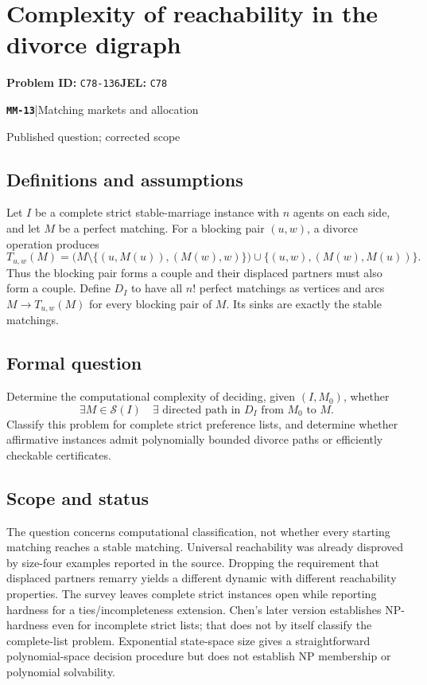 \documentclass[11pt,a4paper]{article}
\newcommand{\entrymeta}[3]{{\sffamily\small\color{muted}\textbf{\texttt{#1}}\quad|\quad #2\par #3\par}}
\begin{document}
\section*{Complexity of reachability in the divorce digraph}
\textbf{Problem ID:} \texttt{C78-136}\quad \textbf{JEL:} \texttt{C78}\par
\label{problem:OP-0554}
\label{beyond:MM-13}
\entrymeta{MM-13}{Matching markets and allocation}{Published question; corrected scope}
\subsection*{Definitions and assumptions}
Let $I$ be a complete strict stable-marriage instance with $n$ agents on each side, and let $M$ be a perfect matching. For a blocking pair $(u,w)$, a divorce operation produces
\[
 T_{u,w}(M)=
 \bigl(M\setminus\{(u,M(u)),(M(w),w)\}\bigr)
 \cup\{(u,w),(M(w),M(u))\}.
\]
Thus the blocking pair forms a couple and their displaced partners must also form a couple. Define $D_I$ to have all $n!$ perfect matchings as vertices and arcs $M\to T_{u,w}(M)$ for every blocking pair of $M$. Its sinks are exactly the stable matchings.
\subsection*{Formal question}
Determine the computational complexity of deciding, given $(I,M_0)$, whether
\[
 \exists M\in\mathcal S(I)\quad\exists\text{ directed path in }D_I
 \text{ from }M_0\text{ to }M.
\]
Classify this problem for complete strict preference lists, and determine whether affirmative instances admit polynomially bounded divorce paths or efficiently checkable certificates.
\subsection*{Scope and status}
The question concerns computational classification, not whether every starting matching reaches a stable matching. Universal reachability was already disproved by size-four examples reported in the source. Dropping the requirement that displaced partners remarry yields a different dynamic with different reachability properties. The survey leaves complete strict instances open while reporting hardness for a ties/incompleteness extension. Chen's later version establishes NP-hardness even for incomplete strict lists; that does not by itself classify the complete-list problem. Exponential state-space size gives a straightforward polynomial-space decision procedure but does not establish NP membership or polynomial solvability.
\end{document}
